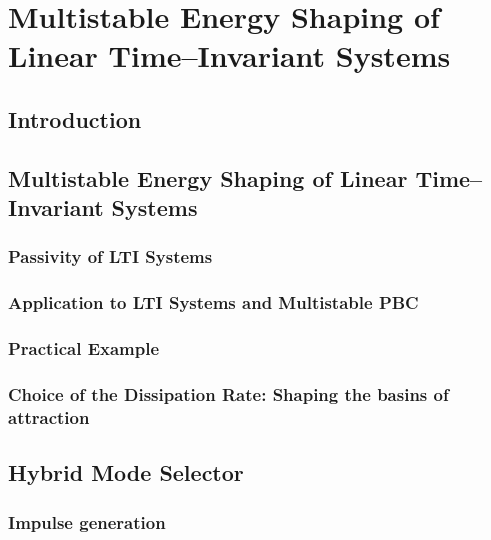
\chapter{Multistable Energy Shaping of Linear Time--Invariant Systems}

\label{chap:multistable}
\minitoc

\thispagestyle{empty}

\newpage
\section{Introduction}
%

\clearpage
%
\section{Multistable Energy Shaping of Linear Time--Invariant Systems}\label{sec:MES}
\subsection{Passivity of LTI Systems}
\subsection{Application to LTI Systems and Multistable PBC}
\subsection{Practical Example}
\subsection{Choice of the Dissipation Rate: Shaping the basins of attraction}
%

\clearpage
\section{Hybrid Mode Selector}
\subsection{Impulse generation}
